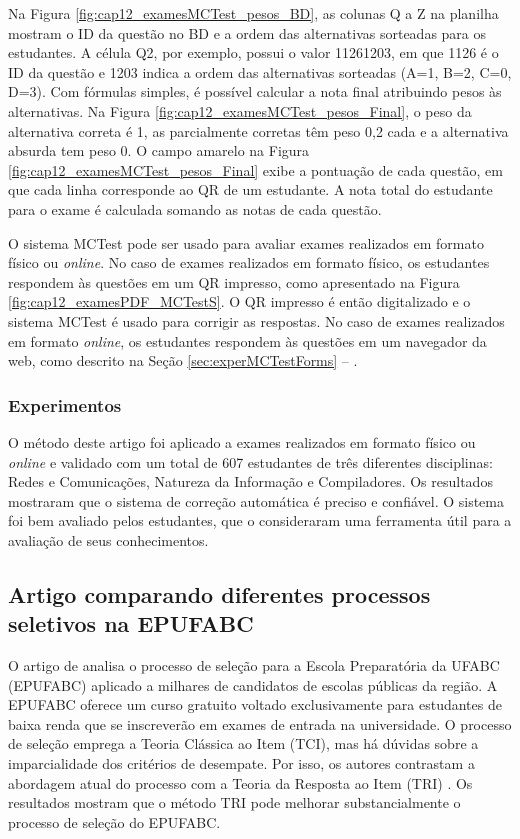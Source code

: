 Na Figura \ref{fig:cap12_examesMCTest_pesos_BD}, as colunas Q a Z na planilha mostram o ID da questão no BD e a ordem das alternativas sorteadas para os estudantes. A célula Q2, por exemplo, possui o valor 11261203, em que  1126 é o ID da questão e 1203 indica a ordem das alternativas sorteadas (A=1, B=2, C=0, D=3). Com fórmulas simples, é possível calcular a nota final atribuindo pesos às alternativas. Na Figura \ref{fig:cap12_examesMCTest_pesos_Final}, o peso da alternativa correta é 1, as parcialmente corretas têm peso 0,2 cada e a alternativa absurda tem peso 0. O campo amarelo na Figura \ref{fig:cap12_examesMCTest_pesos_Final} exibe a pontuação de cada questão, em que cada linha corresponde ao QR de um estudante. A nota total do estudante para o exame é calculada somando as notas de cada questão.

O sistema MCTest pode ser usado para avaliar exames realizados em formato físico ou \textit{online}. No caso de exames realizados em formato físico, os estudantes respondem às questões em um QR impresso, como apresentado na Figura \ref{fig:cap12_examesPDF_MCTestS}. O QR impresso é então digitalizado e o sistema MCTest é usado para corrigir as respostas. No caso de exames realizados em formato \textit{online}, os estudantes respondem às questões em um navegador da web, como descrito na Seção \ref{sec:experMCTestForms} -- . 

\subsubsection{Experimentos}

O método deste artigo foi aplicado a exames realizados em formato físico ou \textit{online} e validado com um total de 607 estudantes de três diferentes disciplinas: Redes e Comunicações, Natureza da Informação e Compiladores. Os resultados mostraram que o sistema de correção automática é preciso e confiável. O sistema foi bem avaliado pelos estudantes, que o consideraram uma ferramenta útil para a avaliação de seus conhecimentos.

\subsection*{Artigo comparando diferentes processos seletivos na EPUFABC}

O artigo de  analisa o processo de seleção para a Escola Preparatória da UFABC (EPUFABC) aplicado a milhares de candidatos de escolas públicas da região. A EPUFABC oferece um curso gratuito voltado exclusivamente para estudantes de baixa renda que se inscreverão em exames de entrada na universidade. O processo de seleção emprega a Teoria Clássica ao Item (TCI), mas há dúvidas sobre a imparcialidade dos critérios de desempate. Por isso, os autores contrastam a abordagem atual do processo com a Teoria da Resposta ao Item (TRI) \cite{birnbaum1968some}. Os resultados mostram que o método TRI pode melhorar substancialmente o processo de seleção do EPUFABC.

